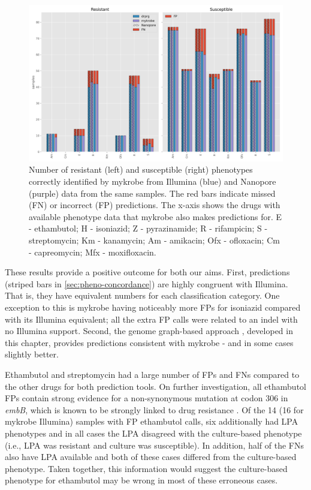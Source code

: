 \begin{figure}
\begin{center}
\includegraphics[width=0.90\columnwidth]{Chapter3/Figs/pheno_concordance_plot.png}
\caption{{Number of resistant (left) and susceptible (right) phenotypes correctly identified by mykrobe from Illumina (blue) and Nanopore (purple) data from the same samples. The red bars indicate missed (FN) or incorrect (FP) predictions. The x-axis shows the drugs with available phenotype data that mykrobe also makes predictions for. E - ethambutol; H - isoniazid; Z - pyrazinamide; R - rifampicin; S - streptomycin; Km - kanamycin; Am - amikacin; Ofx - ofloxacin; Cm - capreomycin; Mfx - moxifloxacin.
{\label{fig:pheno-concordance}}
}}
\end{center}
\end{figure}

These results provide a positive outcome for both our aims. First, \ont{} predictions (striped bars in \autoref{sec:pheno-concordance}) are highly congruent with Illumina. That is, they have equivalent numbers for each classification category. One exception to this is mykrobe \ont{} having noticeably more FPs for isoniazid compared with its Illumina equivalent; all the extra FP calls were related to an indel with no Illumina support. Second, the genome graph-based approach \drprg{}, developed in this chapter, provides predictions consistent with mykrobe - and in some cases slightly better. 

Ethambutol and streptomycin had a large number of FPs and FNs compared to the other drugs for both prediction tools. On further investigation, all ethambutol FPs contain strong evidence for a non-synonymous mutation at codon 306 in \textit{embB}, which is known to be strongly linked to drug resistance \cite{Maningi2017,Srivastava2009,Brossier2015}. Of the 14 (16 for mykrobe Illumina) samples with FP ethambutol calls, six additionally had LPA phenotypes and in all cases the LPA disagreed with the culture-based phenotype (i.e., LPA was resistant and culture was susceptible). In addition, half of the FNs also have LPA available and both of these cases differed from the culture-based phenotype. Taken together, this information would suggest the culture-based phenotype for ethambutol may be wrong in most of these erroneous cases.

